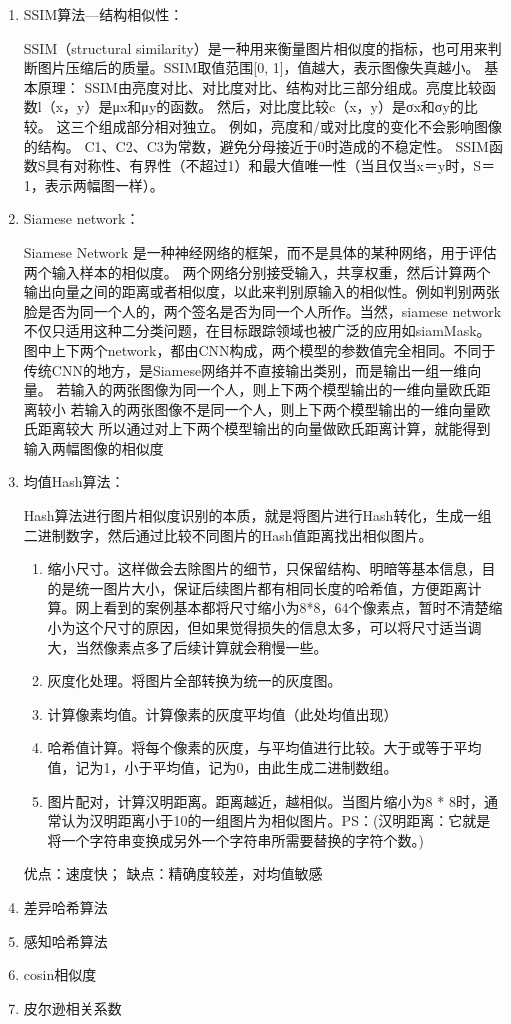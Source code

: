 \documentclass[UTF8,a4paper,AutoFakeBold,AutoFakeSlant]{ctexart}
\begin{document}
\begin{enumerate}
	\item SSIM算法—结构相似性：
	
	SSIM（structural similarity）是一种用来衡量图片相似度的指标，也可用来判断图片压缩后的质量。SSIM取值范围[0, 1]，值越大，表示图像失真越小。
基本原理：
SSIM由亮度对比、对比度对比、结构对比三部分组成。亮度比较函数l（x，y）是μx和μy的函数。
然后，对比度比较c（x，y）是σx和σy的比较。
这三个组成部分相对独立。 例如，亮度和/或对比度的变化不会影响图像的结构。
C1、C2、C3为常数，避免分母接近于0时造成的不稳定性。
SSIM函数S具有对称性、有界性（不超过1）和最大值唯一性（当且仅当x＝y时，S＝1，表示两幅图一样）。
	\item Siamese network：
	
	Siamese Network 是一种神经网络的框架，而不是具体的某种网络，用于评估两个输入样本的相似度。
	两个网络分别接受输入，共享权重，然后计算两个输出向量之间的距离或者相似度，以此来判别原输入的相似性。例如判别两张脸是否为同一个人的，两个签名是否为同一个人所作。当然，siamese network不仅只适用这种二分类问题，在目标跟踪领域也被广泛的应用如siamMask。
图中上下两个network，都由CNN构成，两个模型的参数值完全相同。不同于传统CNN的地方，是Siamese网络并不直接输出类别，而是输出一组一维向量。
若输入的两张图像为同一个人，则上下两个模型输出的一维向量欧氏距离较小
若输入的两张图像不是同一个人，则上下两个模型输出的一维向量欧氏距离较大
所以通过对上下两个模型输出的向量做欧氏距离计算，就能得到输入两幅图像的相似度
	\item 均值Hash算法：
	
	Hash算法进行图片相似度识别的本质，就是将图片进行Hash转化，生成一组二进制数字，然后通过比较不同图片的Hash值距离找出相似图片。
	\begin{enumerate}
		\item 缩小尺寸。这样做会去除图片的细节，只保留结构、明暗等基本信息，目的是统一图片大小，保证后续图片都有相同长度的哈希值，方便距离计算。网上看到的案例基本都将尺寸缩小为8*8，64个像素点，暂时不清楚缩小为这个尺寸的原因，但如果觉得损失的信息太多，可以将尺寸适当调大，当然像素点多了后续计算就会稍慢一些。
		\item 灰度化处理。将图片全部转换为统一的灰度图。
		\item 计算像素均值。计算像素的灰度平均值（此处均值出现）
		\item 哈希值计算。将每个像素的灰度，与平均值进行比较。大于或等于平均值，记为1，小于平均值，记为0，由此生成二进制数组。
		\item 图片配对，计算汉明距离。距离越近，越相似。当图片缩小为8 * 8时，通常认为汉明距离小于10的一组图片为相似图片。PS：(汉明距离：它就是将一个字符串变换成另外一个字符串所需要替换的字符个数。)
	\end{enumerate}
	优点：速度快；
缺点：精确度较差，对均值敏感
	\item 差异哈希算法
	\item 感知哈希算法
	\item cosin相似度
	\item 皮尔逊相关系数
\end{enumerate}
\end{document}
